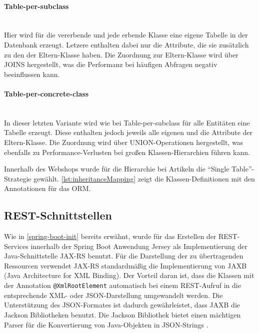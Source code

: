 \paragraph{Table-per-subclass}$\;$ \\
Hier wird für die vererbende und jede erbende Klasse eine eigene Tabelle in der Datenbank erzeugt. Letzere enthalten dabei nur die Attribute, die sie zusätzlich zu den der Eltern-Klasse haben.
Die Zuordnung zur Eltern-Klasse wird über JOINS hergestellt, was die Performanz bei häufigen Abfragen negativ beeinflussen kann.
\paragraph{Table-per-concrete-class}$\;$ \\
In dieser letzten Variante wird wie bei Table-per-subclass für alle Entitäten eine Tabelle erzeugt. Diese enthalten jedoch jeweils alle eigenen und die Attribute der Eltern-Klasse.
Die Zuordnung wird über UNION-Operationen hergestellt, was ebenfalls zu Performance-Verlusten bei großen Klassen-Hierarchien führen kann.

Innerhalb des Webshops wurde für die Hierarchie bei Artikeln die \enquote{Single Table}-Strategie gewählt.
\cref{lst:inheritanceMapping} zeigt die Klassen-Definitionen mit den Annotationen für das \acs{ORM}.
\\


\subsection{REST-Schnittstellen}
Wie in \cref{spring-boot-init} bereits erwähnt, wurde für das Erstellen der REST-Services innerhalb der Spring Boot Anwendung Jersey als Implementierung der Java-Schnittstelle \acs{JAX-RS} benutzt.
Für die Darstellung der zu übertragenden Ressourcen verwendet JAX-RS standardmäßig die Implementierung von \acs{JAXB} (Java Architecture for XML Binding).
Der Vorteil daran ist, dass die Klassen mit der Annotation \texttt{@XmlRootElement} automatisch bei einem REST-Aufruf in die entsprechende XML- oder \acs{JSON}-Darstellung umgewandelt werden.
Die Unterstützung des JSON-Formates ist dadurch gewährleistet, dass JAXB die Jackson Bibliotheken benutzt.
Die Jackson Bibliothek bietet einen mächtigen Parser für die Konvertierung von Java-Objekten in JSON-Strings \cite{Oracle2015}.

